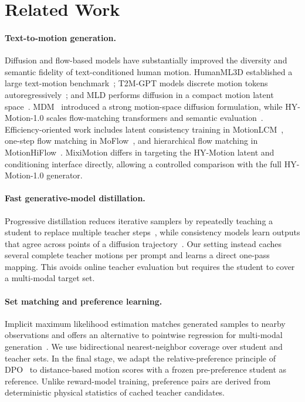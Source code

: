 \documentclass[runningheads]{llncs}
\begin{document}
\section{Related Work}

\paragraph{Text-to-motion generation.}
Diffusion and flow-based models have substantially improved the diversity and
semantic fidelity of text-conditioned human motion. HumanML3D established a
large text-motion benchmark~\cite{humanml3d2022}; T2M-GPT models discrete
motion tokens autoregressively~\cite{t2mgpt2023}; and MLD performs diffusion in
a compact motion latent space~\cite{mld2023}. MDM~\cite{mdm2022} introduced a
strong motion-space diffusion formulation, while HY-Motion-1.0 scales
flow-matching transformers and semantic evaluation~\cite{hymotion2025}.
Efficiency-oriented work includes latent consistency training in
MotionLCM~\cite{motionlcm2024}, one-step flow matching in
MoFlow~\cite{moflow2024}, and hierarchical flow matching in
MotionHiFlow~\cite{motionhiflow2026}. MixiMotion differs in targeting the
HY-Motion latent and conditioning interface directly, allowing a controlled
comparison with the full HY-Motion-1.0 generator.

\paragraph{Fast generative-model distillation.}
Progressive distillation reduces iterative samplers by repeatedly teaching a
student to replace multiple teacher steps~\cite{progressivedistill2022}, while
consistency models learn outputs that agree across points of a diffusion
trajectory~\cite{consistencymodels2023}. Our setting instead caches several
complete teacher motions per prompt and learns a direct one-pass mapping. This
avoids online teacher evaluation but requires the student to cover a
multi-modal target set.

\paragraph{Set matching and preference learning.}
Implicit maximum likelihood estimation matches generated samples to nearby
observations and offers an alternative to pointwise regression for
multi-modal generation~\cite{imle2018}. We use bidirectional nearest-neighbor
coverage over student and teacher sets. In the final stage, we adapt the
relative-preference principle of DPO~\cite{dpo2023} to distance-based motion
scores with a frozen pre-preference student as reference. Unlike reward-model
training, preference pairs are derived from deterministic physical statistics
of cached teacher candidates.
\end{document}
